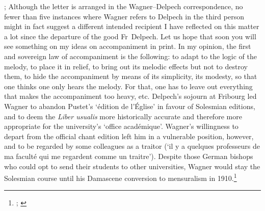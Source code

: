   {; Although the letter is arranged in the Wagner--Delpech correspondence, no fewer than five instances where Wagner refers to Delpech in the third person might in fact suggest a different intended recipient}
{I have reflected on this matter a lot since the departure of the good Fr~Delpech. Let us hope that soon you will see something on my ideas on accompaniment in print. In my opinion, the first and sovereign law of accompaniment is the following: to adapt to the logic of the melody, to place it in relief, to bring out its melodic effects but not to destroy them, to hide the accompaniment by means of its simplicity, its modesty, so that one thinks one only hears the melody. For that, one has to leave out everything that makes the accompaniment too heavy, etc.}
\noindent
Delpech's sojourn at Fribourg led Wagner to abandon Pustet's `édition de l'Église' in favour of Solesmian editions, and to deem the \emph{Liber usualis} more historically accurate and therefore more appropriate for the university's `office académique'.
Wagner's willingness to depart from the official chant edition left him in a vulnerable position, however, and to be regarded by some colleagues as a traitor (`il y a quelques professeurs de ma faculté qui me regardent comme un traitre').
Despite those German bishops who could opt to send their students to other universities, Wagner would stay the Solesmian course until his Damascene conversion to mensuralism in 1910.\footnote{; \cite{JohnA.WagnerPeter}}

